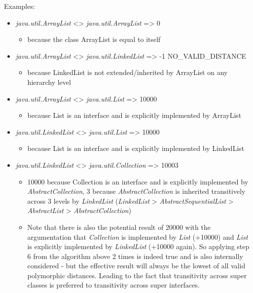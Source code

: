 Examples:
\begin{itemize}
	\item \textit{java.util.ArrayList} <> \textit{java.util.ArrayList} => 0
	\begin{itemize}
		\item because the class ArrayList is equal to itself
	\end{itemize}
	\item \textit{java.util.ArrayList} <> \textit{java.util.LinkedList} => -1 NO\_VALID\_DISTANCE
	\begin{itemize}
		\item because LinkedList is not extended/inherited by ArrayList on any hierarchy level
	\end{itemize}
	\item \textit{java.util.ArrayList} <> \textit{java.util.List} => 10000
	\begin{itemize}
		\item because List is an interface and is explicitly implemented by ArrayList
	\end{itemize}
	\item \textit{java.util.LinkedList} <> \textit{java.util.List} => 10000
	\begin{itemize}
		\item because List is an interface and is explicitly implemented by LinkedList
	\end{itemize}
	\item \textit{java.util.LinkedList} <> \textit{java.util.Collection} => 10003
	\begin{itemize}
		\item 10000 because Collection is an interface and is explicitly implemented by \textit{AbstractCollection}, 3 because \textit{AbstractCollection} is inherited transitively across 3 levels by \textit{LinkedList} (\textit{LinkedList} > \textit{AbstractSequentialList} > \textit{AbstractList} > \textit{AbstractCollection})
		\item Note that there is also the potential result of 20000 with the argumentation that \textit{Collection} is implemented by \textit{List} (+10000) and \textit{List} is explicitly implemented by \textit{LinkedList} (+10000 again). So applying step 6 from the algorithm above 2 times is indeed true and is also internally considered - but the effective result will always be the lowest of all valid polymorphic distances. Leading to the fact that transitivity across super classes is preferred to transitivity across super interfaces.
	\end{itemize}
\end{itemize}